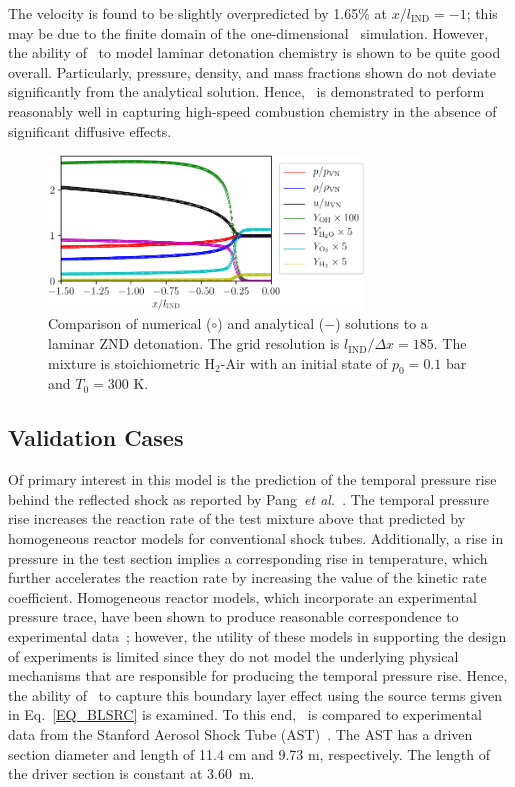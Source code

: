  The velocity is found to be slightly overpredicted by 1.65\% at $x/l_\mathrm{IND}=-1$; this may be due to the finite domain of the one-dimensional \stnshk\ simulation. However, the ability of \stnshk\ to model laminar detonation chemistry is shown to be quite good overall. Particularly, pressure, density, and mass fractions shown do not deviate significantly from the analytical solution. Hence, \stnshk\ is demonstrated to perform reasonably well in capturing high-speed combustion chemistry in the absence of significant diffusive effects.

\begin{figure}[!ht!]
	\centering
	\includegraphics[width=84mm]{ZNDDetonation}
	\caption{\label{FIG_ZND} Comparison of numerical ($\circ$) and analytical ($-$) solutions to a laminar ZND detonation. The grid resolution is $l_\mathrm{IND}/\Delta x=185$. The mixture is stoichiometric H$_2$-Air with an initial state of $p_0=0.1$ bar and $T_0=300$ K.} 
\end{figure}

\subsection{Validation Cases}

Of primary interest in this model is the prediction of the temporal pressure rise behind the reflected shock as reported by Pang~\emph{et al.}~\cite{PANG_DAVIDSON_HANSON_PCI32}. The temporal pressure rise increases the reaction rate of the test mixture above that predicted by homogeneous reactor models for conventional shock tubes. Additionally, a rise in pressure in the test section implies a corresponding rise in temperature, which further accelerates the reaction rate by increasing the value of the kinetic rate coefficient. Homogeneous reactor models, which incorporate an experimental pressure trace, have been shown to produce reasonable correspondence to experimental data~\cite{PANG_DAVIDSON_HANSON_PCI32}; however, the utility of these models in supporting the design of experiments is limited since they do not model the underlying physical mechanisms that are responsible for producing the temporal pressure rise. Hence, the ability of \stnshk\ to capture this boundary layer effect using the source terms given in Eq.~\ref{EQ_BLSRC} is examined. To this end, \stnshk\ is compared to experimental data from the Stanford Aerosol Shock Tube (AST)~\cite{CAMPBELL_THESIS}. The AST  has a driven section diameter and length of 11.4 cm and 9.73 m, respectively. The length of the driver section is constant at 3.60~m. 

